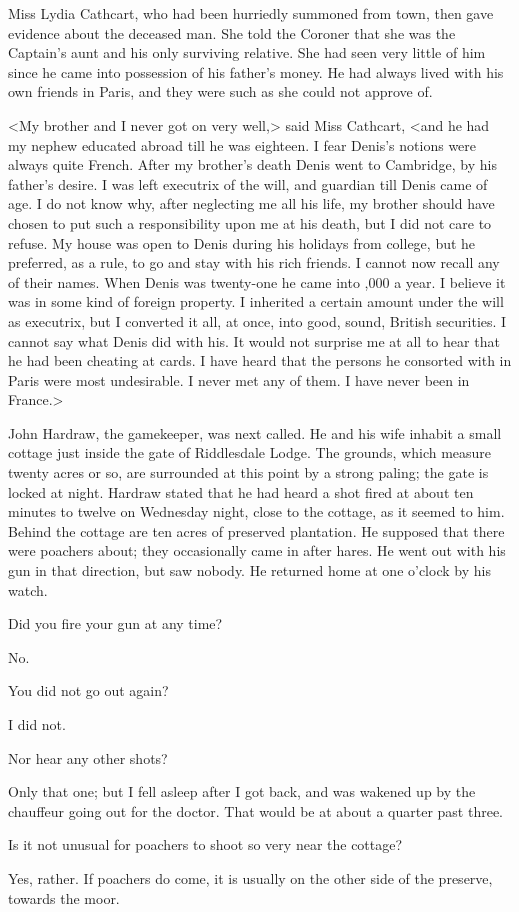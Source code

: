 Miss Lydia Cathcart, who had been hurriedly summoned from town, then gave evidence about the deceased man. She told the Coroner that she was the Captain's aunt and his only surviving relative. She had seen very little of him since he came into possession of his father's money. He had always lived with his own friends in Paris, and they were such as she could not approve of.

<My brother and I never got on very well,> said Miss Cathcart, <and he had my nephew educated abroad till he was eighteen. I fear Denis's notions were always quite French. After my brother's death Denis went to Cambridge, by his father's desire. I was left executrix of the will, and guardian till Denis came of age. I do not know why, after neglecting me all his life, my brother should have chosen to put such a responsibility upon me at his death, but I did not care to refuse.  My house was open to Denis during his holidays from college, but he preferred, as a rule, to go and stay with his rich friends. I cannot now recall any of their names. When Denis was twenty-one he came into ,000 a year. I believe it was in some kind of foreign property. I inherited a certain amount under the will as executrix, but I converted it all, at once, into good, sound, British securities. I cannot say what Denis did with his. It would not surprise me at all to hear that he had been cheating at cards. I have heard that the persons he consorted with in Paris were most undesirable. I never met any of them.  I have never been in France.>

John Hardraw, the gamekeeper, was next called. He and his wife inhabit a small cottage just inside the gate of Riddlesdale Lodge. The grounds, which measure twenty acres or so, are surrounded at this point by a strong paling; the gate is locked at night. Hardraw stated that he had heard a shot fired at about ten minutes to twelve on Wednesday night, close to the cottage, as it seemed to him. Behind the cottage are ten acres of preserved plantation. He supposed that there were poachers about; they occasionally came in after hares. He went out with his gun in that direction, but saw nobody. He returned home at one o'clock by his watch.

\begin{dialogue}

 Did you fire your gun at any time?

 No.

 You did not go out again?

 I did not.

 Nor hear any other shots?

 Only that one; but I fell asleep after I got back, and was wakened up by the chauffeur going out for the doctor. That would be at about a quarter past three.

 Is it not unusual for poachers to shoot so very near the cottage?

 Yes, rather. If poachers do come, it is usually on the other side of the preserve, towards the moor.
\end{dialogue}


